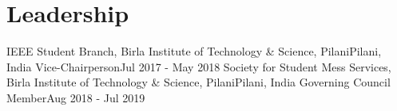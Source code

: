 \section{Leadership}
\vspace{5pt}

\resumeSubHeadingListStart
\resumeHeadingFour
{IEEE Student Branch, Birla Institute of Technology \& Science, Pilani}{Pilani, India}
{Vice-Chairperson}{Jul 2017 - May 2018}
\resumeHeadingFour
{Society for Student Mess Services, Birla Institute of Technology \& Science, Pilani}{Pilani, India}
{Governing Council Member}{Aug 2018 - Jul 2019}
\resumeSubHeadingListEnd
